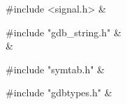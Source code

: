 \medskip
\begin{cxreftabi}
{\stt \#include <signal.h>} &\\
\end{cxreftabi}

\medskip
\begin{cxreftabi}
{\stt \#include "gdb\_string.h"} &\\
\hspace*{0.2in}{\stt \#include <string.h>} &\\
\end{cxreftabi}

\medskip
\begin{cxreftabi}
{\stt \#include "symtab.h"} &\\
\end{cxreftabi}

\medskip
\begin{cxreftabi}
{\stt \#include "gdbtypes.h"} &\\
\end{cxreftabi}

